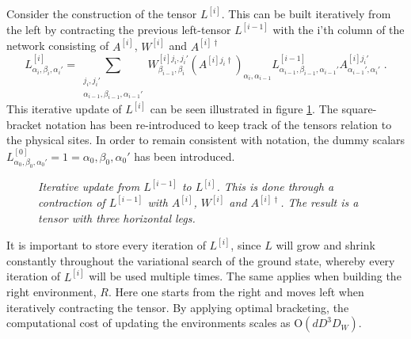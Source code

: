 Consider the construction of the tensor $L^{[i]}$. This can be built iteratively from the left by contracting the previous left-tensor $L^{[i-1]}$ with the i'th column of the network consisting of $A^{[i]}$, $W^{[i]}$ and $A^{[i] \dag}$
\begin{equation}
	L_{\alpha_i , \beta_i , \alpha_i '}^{[i]} = \sum_{\substack{ j_i , j_i ' \\ \alpha_{i-1} , \beta_{i-1} , \alpha_{i-1} '}} W_{\beta_{i-1} , \beta_i}^{[i] j_i , j_i '} \left( A^{[i] j_i \dag} \right)_{\alpha_i , \alpha_{i-1}} L_{\alpha_{i-1} , \beta_{i-1} , \alpha_{i-1} '}^{[i-1]} A_{\alpha_{i-1} ' , \alpha_i '}^{[i] j_i '} \; .
\end{equation}
This iterative update of $L^{[i]}$ can be seen illustrated in figure \ref{fig:buildLTensor}. The square-bracket notation has been re-introduced to keep track of the tensors relation to the physical sites. In order to remain consistent with notation, the dummy scalars $L_{\alpha_0 , \beta_0 , \alpha_0 '}^{[0]}  = 1  = \alpha_0 , \beta_0 , \alpha_0 '$ has been introduced.\\
\begin{figure}[h!]
	\centering
	
	\caption{\textit{Iterative update from $L^{[i-1]}$ to $L^{[i]}$. This is done through a contraction of $L^{[i-1]}$ with $A^{[i]}$, $W^{[i]}$ and $A^{[i] \dag}$. The result is a tensor with three horizontal legs.}}
	\label{fig:buildLTensor}
\end{figure}
It is important to store every iteration of $L^{[i]}$, since $L$ will grow and shrink constantly throughout the variational search of the ground state, whereby every iteration of $L^{[i]}$ will be used multiple times.
The same applies when building the right environment, $R$. Here one starts from the right and moves left when iteratively contracting the tensor. By applying optimal bracketing, the computational cost of updating the environments scales as $\mathrm{O}(d D^3 D_W)$.
  

